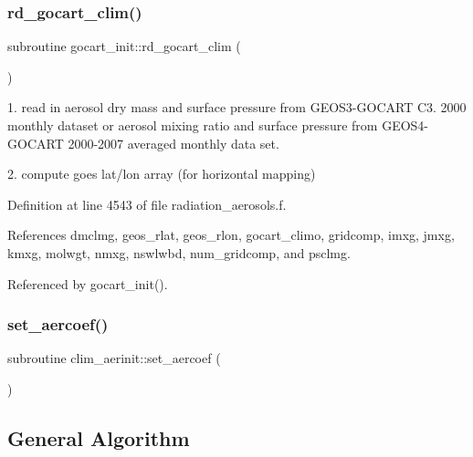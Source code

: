 \subsubsection{\texorpdfstring{rd\+\_\+gocart\+\_\+clim()}{rd\_gocart\_clim()}}
{\footnotesize\ttfamily subroutine gocart\+\_\+init\+::rd\+\_\+gocart\+\_\+clim (\begin{DoxyParamCaption}{ }\end{DoxyParamCaption})\hspace{0.3cm}{\ttfamily [private]}}


\begin{DoxyItemize}
\item 1. read in aerosol dry mass and surface pressure from G\+E\+O\+S3-\/\+G\+O\+C\+A\+RT C3. 2000 monthly dataset or aerosol mixing ratio and surface pressure from G\+E\+O\+S4-\/\+G\+O\+C\+A\+RT 2000-\/2007 averaged monthly data set.
\item 2. compute goes lat/lon array (for horizontal mapping) 
\end{DoxyItemize}

Definition at line 4543 of file radiation\+\_\+aerosols.\+f.



References dmclmg, geos\+\_\+rlat, geos\+\_\+rlon, gocart\+\_\+climo, gridcomp, imxg, jmxg, kmxg, molwgt, nmxg, nswlwbd, num\+\_\+gridcomp, and psclmg.



Referenced by gocart\+\_\+init().

\mbox{\label{group__module__radiation__aerosols_ga95fabbc4272ae70f3b345f9b1a898d46}} 
\subsubsection{\texorpdfstring{set\+\_\+aercoef()}{set\_aercoef()}}
{\footnotesize\ttfamily subroutine clim\+\_\+aerinit\+::set\+\_\+aercoef (\begin{DoxyParamCaption}{ }\end{DoxyParamCaption})\hspace{0.3cm}{\ttfamily [private]}}

\hypertarget{group__module__radiation__aerosols_det_set_aercoef}{}\subsection{General Algorithm}\label{group__module__radiation__aerosols_det_set_aercoef}

